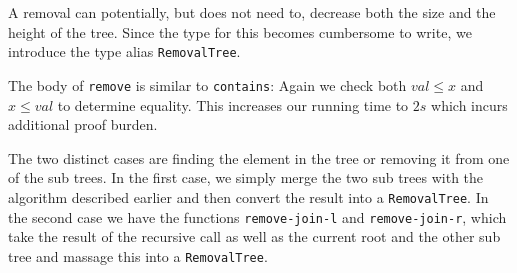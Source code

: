 A removal can potentially, but does not need to, decrease both the size and the height of the tree. Since the type for this becomes cumbersome to write, we introduce the type alias \texttt{RemovalTree}.

The body of \texttt{remove} is similar to \texttt{contains}: Again we check both $val \leq x$ and $x \leq val$ to determine equality. This increases our running time to $2s$ which incurs additional proof burden.

The two distinct cases are finding the element in the tree or removing it from one of the sub trees. In the first case, we simply merge the two sub trees with the algorithm described earlier and then convert the result into a \texttt{RemovalTree}. In the second case we have the functions \texttt{remove-join-l} and \texttt{remove-join-r}, which take the result of the recursive call as well as the current root and the other sub tree and massage this into a \texttt{RemovalTree}.